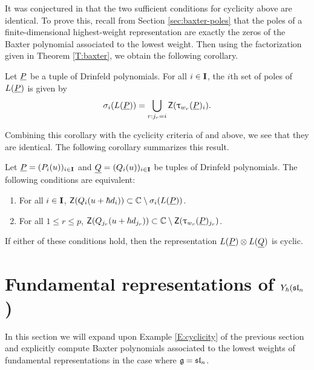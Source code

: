 It was conjectured in \cite[\S 7.5]{gautam_poles_2023} that the two sufficient conditions for cyclicity above are identical.
To prove this, recall from Section \ref{sec:baxter-poles} that the poles of a finite-dimensional highest-weight representation are exactly the zeros of the Baxter polynomial associated to the lowest weight.
Then using the factorization given in Theorem \ref{T:baxter}, we obtain the following corollary.

\begin{corollary}\label{C:baxter-poles}
    Let $\underline{P}$ be a tuple of Drinfeld polynomials.
    For all $i\in\mathbf{I}$, the $i$th set of poles of $L(\underline{P})$ is given by
    \[\sigma_i(L(\underline{P})) = \bigcup_{r:j_r=i}\mathsf{Z}(\uptau_{w_r}(\underline{P})_i).\]
\end{corollary}

Combining this corollary with the cyclicity criteria of \cite{gautam_poles_2023} and \cite{tan_braid_2015} above, we see that they are identical.
The following corollary summarizes this result.

\begin{corollary}\label{C:cyclicity}
    Let $\underline{P} = (P_i(u))_{i\in\mathbf{I}}$ and $\underline{Q} = (Q_i(u))_{i\in\mathbf{I}}$ be tuples of Drinfeld polynomials.
    The following conditions are equivalent:
    \begin{enumerate}
        \item For all $i\in\mathbf{I}$, $\mathsf{Z}(Q_i(u+\hbar d_i))\subset\mathbb{C}\setminus\sigma_i(L(\underline{P}))$.
        \item For all $1\leq r\leq p$, $\mathsf{Z}(Q_{j_r}(u+\hbar d_{j_r}))\subset\mathbb{C}\setminus\mathsf{Z}(\uptau_{w_r}(\underline{P})_{j_r})$.
    \end{enumerate}
    If either of these conditions hold, then the representation $L(\underline{P})\otimes L(\underline{Q})$ is cyclic.
\end{corollary}


\section{Fundamental representations of \texorpdfstring{$Y_\hbar(\mathfrak{sl}_n$)}{Y(sln)}}\label{sec:baxter-example}

In this section we will expand upon Example \ref{E:cyclicity} of the previous section and explicitly compute Baxter polynomials associated to the lowest weights of fundamental representations in the case where $\mathfrak{g}=\mathfrak{sl}_n$.

